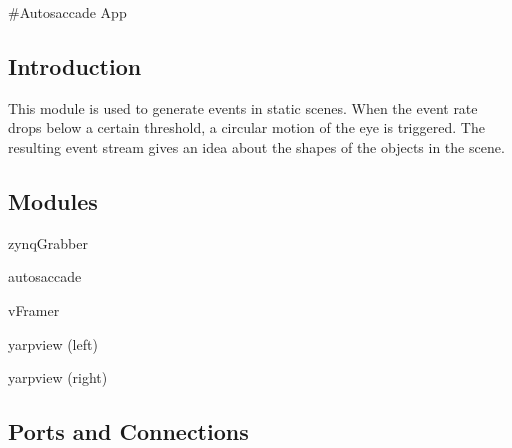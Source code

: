 \#\+Autosaccade App

\subsection*{Introduction }

This module is used to generate events in static scenes. When the event rate drops below a certain threshold, a circular motion of the eye is triggered. The resulting event stream gives an idea about the shapes of the objects in the scene.

\subsection*{Modules }


\begin{DoxyItemize}
\item zynq\+Grabber
\item autosaccade
\item v\+Framer
\item yarpview (left)
\item yarpview (right)
\end{DoxyItemize}

\subsection*{Ports and Connections }

 